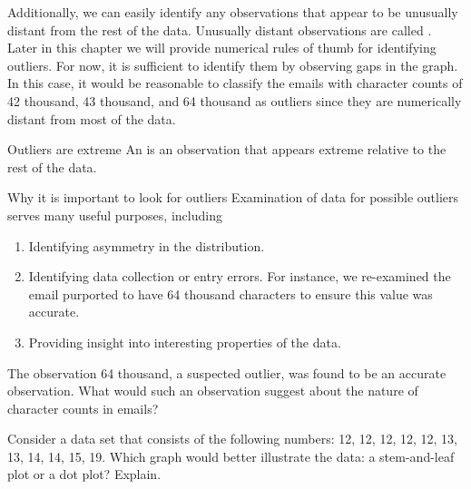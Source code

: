 Additionally, we can easily identify any observations that appear to be unusually distant from the rest of the data. Unusually distant observations are called . Later in this chapter we will provide numerical rules of thumb for identifying outliers. For now, it is sufficient to identify them by observing gaps in the graph. In this case, it would be reasonable to classify the emails with character counts of 42 thousand, 43 thousand, and 64 thousand as outliers since they are numerically distant from most of the data.


\begin{onebox}{Outliers are extreme}
An  is an observation that appears extreme relative to the rest of the data.\end{onebox}


\begin{onebox}{Why it is important to look for outliers}
Examination of data for possible outliers serves many useful purposes, including\vspace{-2mm}
\begin{enumerate}
\setlength{\itemsep}{0mm}
\item Identifying asymmetry in the distribution.
\item Identifying data collection or entry errors. For instance, we re-examined the email purported to have 64 thousand characters to ensure this value was accurate.
\item Providing insight into interesting properties of the data.\vspace{0.5mm}
\end{enumerate}\end{onebox}

\begin{exercisewrap}
\begin{nexercise}
The observation 64 thousand, a suspected outlier, was found to be an accurate observation. What would such an observation suggest about the nature of character counts in emails?\footnotemark
\end{nexercise}
\end{exercisewrap}

\begin{exercisewrap}
\begin{nexercise}
Consider a data set that consists of the following numbers:  12, 12, 12, 12, 12, 13, 13, 14, 14, 15, 19. Which graph would better illustrate the data: a stem-and-leaf plot or a dot plot? Explain.\footnotemark
\end{nexercise}
\end{exercisewrap}

